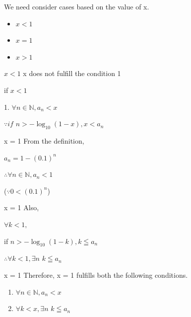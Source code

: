 \begin{frame}[c]{}{}
  We need consider cases based on the value of x.

  \vspace{2ex}

  \begin{itemize}
  \item $x < 1$
  \item $x = 1$
  \item $x > 1$
  \end{itemize}
\end{frame}

\begin{frame}[c]{$x < 1$}{}
  x does not fulfill the condition 1

  if $x < 1$

  \vspace{2ex}

  1. $\forall n \in \mathbb{N}, a_n < x$

  \vspace{2ex}

  $\because if$ $n > -\log_{10} (1 - x), x < a_n$
\end{frame}

\begin{frame}[c]{x = 1}{}
  From the definition,

  $a_n = 1 - (0.1)^n$

  \vspace{2ex}

  $\therefore \forall n \in \mathbb{N}, a_n < 1$

  ($\because 0 < (0.1)^n$)
\end{frame}

\begin{frame}[c]{x = 1}{}
  Also,

  \vspace{2ex}

  $\forall k < 1,$

  if $n > -\log_{10} (1 - k), k \leqq a_n$

  \vspace{2ex}

  $\therefore \forall k < 1, \exists n$ $k \leqq a_n$
\end{frame}

\begin{frame}[c]{x = 1}{}
  Therefore, x = 1 fulfills both the following conditions.

  \vspace{2ex}

  \begin{enumerate}
  \item $\forall n \in \mathbb{N}, a_n < x$
  \item $\forall k < x, \exists n$ $k \leqq a_n$
  \end{enumerate}
\end{frame}

